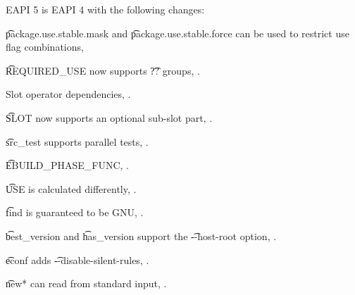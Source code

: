 EAPI 5 is EAPI 4 with the following changes:

\begin{compactitem}
\item \t{package.use.stable.mask} and \t{package.use.stable.force} can be used to restrict
    use flag combinations, 
\item \t{REQUIRED\_USE} now supports \t{??} groups, .
\item Slot operator dependencies, .
\item \t{SLOT} now supports an optional sub-slot part, .
\item \t{src\_test} supports parallel tests, .
\item \t{EBUILD\_PHASE\_FUNC}, .
\item \t{USE} is calculated differently, .
\item \t{find} is guaranteed to be GNU, .
\item \t{best\_version} and \t{has\_version} support the \t{-{}-host-root} option,
    .
\item \t{econf} adds \t{-{}-disable-silent-rules}, .
\item \t{new*} can read from standard input, .
\end{compactitem}



